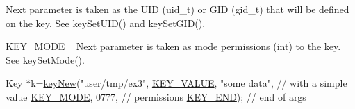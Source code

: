 \begin{DoxyRefList}
\begin{DoxyItemize}
 Next parameter is taken as the U\+I\+D (uid\+\_\+t) or G\+I\+D (gid\+\_\+t) that will be defined on the key. See \hyperlink{group__meta_gab5f284f5ecd261e0a290095f50ba1af7}{key\+Set\+U\+I\+D()} and \hyperlink{group__meta_ga9e3d0fb3f7ba906e067727b9155d22e3}{key\+Set\+G\+I\+D()}.
\item \hyperlink{group__key_gga91fb3178848bd682000958089abbaf40a1b0a91ff3a855d6993930ebf0abaa518}{K\+E\+Y\+\_\+\+M\+O\+D\+E} ~\newline
 Next parameter is taken as mode permissions (int) to the key. See \hyperlink{group__meta_ga8803037e35b9da1ce492323a88ff6bc3}{key\+Set\+Mode()}. 
\begin{DoxyCodeInclude}
Key *k=\hyperlink{group__key_gad23c65b44bf48d773759e1f9a4d43b89}{keyNew}(\textcolor{stringliteral}{"user/tmp/ex3"},
        \hyperlink{group__key_gga91fb3178848bd682000958089abbaf40ac66e4a49d09212b79f5754ca6db5bd2e}{KEY\_VALUE}, \textcolor{stringliteral}{"some data"},    \textcolor{comment}{// with a simple value}
        \hyperlink{group__key_gga91fb3178848bd682000958089abbaf40a1b0a91ff3a855d6993930ebf0abaa518}{KEY\_MODE}, 0777,            \textcolor{comment}{// permissions}
        \hyperlink{group__key_gga91fb3178848bd682000958089abbaf40aa8adb6fcb92dec58fb19410eacfdd403}{KEY\_END});                  \textcolor{comment}{// end of args}
\end{DoxyCodeInclude}


\end{DoxyItemize}
\end{DoxyRefList}
